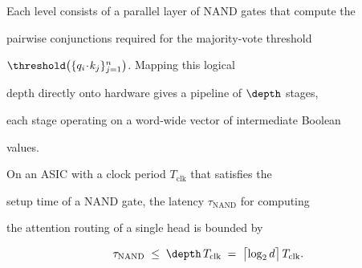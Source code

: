 Each level consists of a parallel layer of NAND gates that compute the






pairwise conjunctions required for the majority‐vote threshold






\(\threshold\bigl(\{q_i\!\cdot\!k_j\}_{j=1}^n\bigr)\).  Mapping this logical






depth directly onto hardware gives a pipeline of \(\depth\) stages,






each stage operating on a word‑wide vector of intermediate Boolean






values.













\begin{theorem}






\label{thm:latency}






On an ASIC with a clock period \(T_{\mathrm{clk}}\) that satisfies the






setup time of a NAND gate, the latency \(\tau_{\text{NAND}}\) for computing






the attention routing of a single head is bounded by






\[






\tau_{\text{NAND}} \;\le\; \depth \, T_{\mathrm{clk}} \;=\;






\bigl\lceil\log_2 d\bigr\rceil \, T_{\mathrm{clk}} .






\]






\end{theorem}







